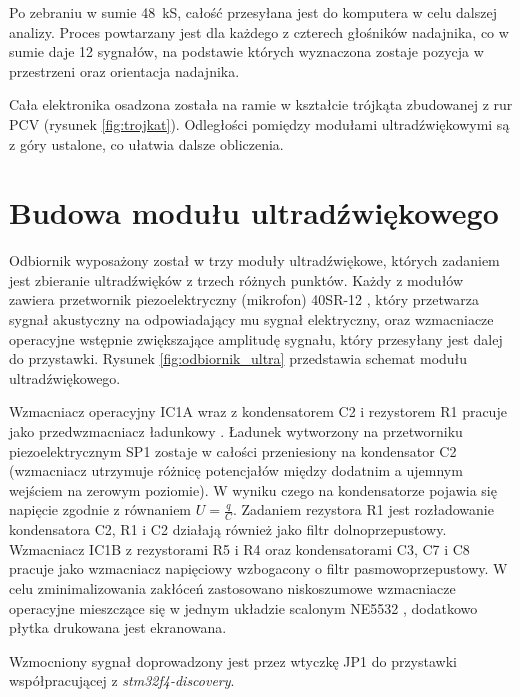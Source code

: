 Po zebraniu w sumie \SI{48}{kS}, całość przesyłana jest do komputera w celu dalszej analizy.
Proces powtarzany jest dla każdego z czterech głośników nadajnika, 
co w sumie daje 12 sygnałów, na podstawie których wyznaczona zostaje 
pozycja w przestrzeni oraz orientacja nadajnika.

Cała elektronika osadzona została na ramie w kształcie trójkąta zbudowanej z rur PCV  (rysunek \ref{fig:trojkat}). 
Odległości pomiędzy modułami ultradźwiękowymi są z góry ustalone, co ułatwia dalsze obliczenia.



\section{Budowa modułu ultradźwiękowego}

Odbiornik wyposażony został w trzy moduły ultradźwiękowe, których zadaniem jest 
zbieranie ultradźwięków z trzech różnych  punktów.
Każdy z modułów zawiera przetwornik piezoelektryczny (mikrofon) 40SR-12 \cite{bib:40ST12},
który przetwarza sygnał akustyczny na odpowiadający mu sygnał elektryczny, oraz wzmacniacze operacyjne 
wstępnie zwiększające amplitudę sygnału, który przesyłany jest dalej do przystawki.
Rysunek \ref{fig:odbiornik_ultra} przedstawia schemat modułu ultradźwiękowego.


Wzmacniacz operacyjny IC1A wraz z kondensatorem C2 i rezystorem R1 pracuje 
jako przedwzmacniacz ładunkowy \cite{bib:wzm_ladunkowy}.
Ładunek wytworzony na przetworniku piezoelektrycznym SP1 zostaje w całości przeniesiony na kondensator C2 
(wzmacniacz utrzymuje różnicę potencjałów między dodatnim a ujemnym wejściem na zerowym poziomie).
W wyniku czego na kondensatorze pojawia się napięcie zgodnie z równaniem $U=\frac{q}{C}$.
Zadaniem rezystora R1 jest rozładowanie kondensatora C2,
R1 i C2 działają również jako filtr dolnoprzepustowy.
Wzmacniacz IC1B z rezystorami R5 i R4 oraz kondensatorami C3, C7 i C8 pracuje jako wzmacniacz napięciowy wzbogacony o 
filtr pasmowoprzepustowy.
W celu zminimalizowania zakłóceń zastosowano niskoszumowe wzmacniacze operacyjne
mieszczące się w jednym układzie scalonym NE5532 \cite{bib:ne5532}, 
dodatkowo płytka drukowana jest ekranowana.

Wzmocniony sygnał doprowadzony jest przez wtyczkę JP1 do przystawki współpracującej z \textit{stm32f4-discovery}.


